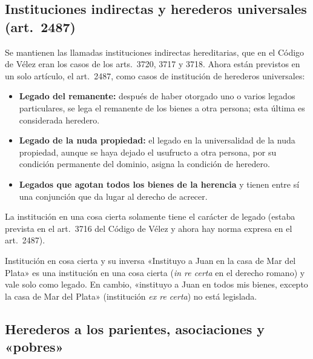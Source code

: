 \documentclass[12pt,oneside]{book}
\begin{document}
\subsection{Instituciones indirectas y herederos universales (art.~2487)}

Se mantienen las llamadas instituciones indirectas hereditarias, que en el Código de Vélez eran los casos de los arts.~3720, 3717 y 3718. Ahora están previstos en un solo artículo, el art.~2487, como casos de institución de herederos universales:

\begin{itemize}
    \item \textbf{Legado del remanente:} después de haber otorgado uno o varios legados particulares, se lega el remanente de los bienes a otra persona; esta última es considerada heredero.
    \item \textbf{Legado de la nuda propiedad:} el legado en la universalidad de la nuda propiedad, aunque se haya dejado el usufructo a otra persona, por su condición permanente del dominio, asigna la condición de heredero.
    \item \textbf{Legados que agotan todos los bienes de la herencia} y tienen entre sí una conjunción que da lugar al derecho de acrecer.
\end{itemize}

La institución en una cosa cierta solamente tiene el carácter de legado (estaba prevista en el art.~3716 del Código de Vélez y ahora hay norma expresa en el art.~2487).

\begin{example}{Institución en cosa cierta y su inversa}
«Instituyo a Juan en la casa de Mar del Plata» es una institución en una cosa cierta (\emph{in re certa} en el derecho romano) y vale solo como legado. En cambio, «instituyo a Juan en todos mis bienes, excepto la casa de Mar del Plata» (institución \emph{ex re certa}) no está legislada.
\end{example}

\subsection{Herederos a los parientes, asociaciones y «pobres»}
\end{document}

